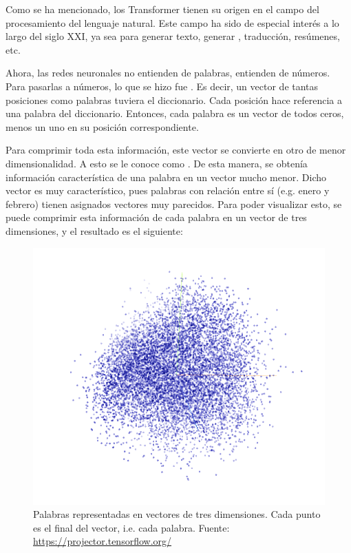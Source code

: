 Como se ha mencionado, los Transformer tienen su origen en el campo del procesamiento del lenguaje natural. Este campo ha sido de especial interés a lo largo del siglo XXI, ya sea para generar texto, generar , traducción, resúmenes, etc. 

Ahora, las redes neuronales no entienden de palabras, entienden de números. Para pasarlas a números, lo que se hizo fue . Es decir, un vector de tantas posiciones como palabras tuviera el diccionario. Cada posición hace referencia a una palabra del diccionario. Entonces, cada palabra es un vector de todos ceros, menos un uno en su posición correspondiente. 


Para comprimir toda esta información, este vector se convierte en otro de menor dimensionalidad. A esto se le conoce como  \parencite{word2vecOriginal} \parencite{word2vecExtension}. De esta manera, se obtenía información característica de una palabra en un vector mucho menor. Dicho vector es muy característico, pues palabras con relación entre sí (e.g. enero y febrero)  tienen asignados vectores muy parecidos. Para poder visualizar esto, se puede comprimir esta información de cada palabra en un vector de tres dimensiones, y el resultado es el siguiente:

\begin{figure}[H]
    \centering
    \includegraphics[scale = 0.5]{imgs/word2vec.png}
    \caption{Palabras representadas en vectores de tres dimensiones. Cada punto es el final del vector, i.e. cada palabra. \scriptsize{Fuente: \url{https://projector.tensorflow.org/}}}
    \label{word2vec}
\end{figure}

